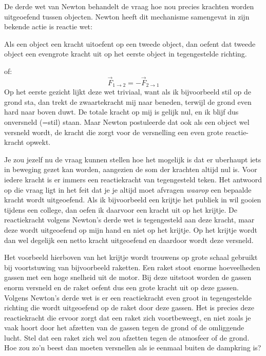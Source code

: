 De derde wet van Newton behandelt de vraag hoe nou precies krachten worden uitgeoefend
tussen objecten. Newton heeft dit mechanisme samengevat in zijn bekende actie is reactie wet:
\begin{Newton3}
Als een object een kracht uitoefent op een tweede object, dan oefent dat tweede object een
evengrote kracht uit op het eerste object in tegengestelde richting.
\end{Newton3}
of:
\begin{equation}
\vec{F}_{1\rightarrow2} = - \vec{F}_{2\rightarrow1}
\end{equation}
Op het eerste gezicht lijkt deze wet triviaal, want als ik bijvoorbeeld stil op de grond sta, dan
trekt de zwaartekracht mij naar beneden, terwijl de grond even hard naar boven duwt. De 
totale kracht op mij is gelijk nul, en ik blijf dus onversneld (=stil) staan. Maar Newton postuleerde
dat ook als een object wel versneld wordt, de kracht die zorgt voor de versnelling een even
grote reactie-kracht opwekt.

Je zou jezelf nu de vraag kunnen stellen hoe het mogelijk is dat er uberhaupt iets in 
beweging gezet kan worden, aangezien de som der krachten altijd nul is. Voor iedere
kracht is er immers een reactiekracht van tegengesteld teken. Het antwoord op die vraag
ligt in het feit dat je je altijd moet afvragen {\it waarop} een bepaalde kracht wordt uitgeoefend.
Als ik bijvoorbeeld een krijtje het publiek in wil gooien tijdens een college, dan oefen ik
daarvoor een kracht uit op het krijtje. De reactiekracht volgens Newton's derde wet is tegengesteld
aan deze kracht, maar deze wordt uitgeoefend op mijn hand en niet op het krijtje. Op
het krijtje wordt dan wel degelijk een netto kracht uitgeoefend en daardoor wordt deze 
versneld.

Het voorbeeld hierboven van het krijtje wordt trouwens op grote schaal gebruikt bij
voortstuwing van bijvoorbeeld raketten. Een raket stoot
enorme hoeveelheden gassen met een hoge snelheid uit de motor. Bij deze
uitstoot worden de gassen enorm versneld en de raket oefent dus een grote kracht
uit op deze gassen. Volgens Newton's derde wet is er een reactiekracht even groot in 
tegengestelde richting die wordt uitgeoefend op de raket door deze gassen. Het is precies
deze reactiekracht die ervoor zorgt dat een raket zich voortbeweegt, en niet zoals je
vaak hoort door het afzetten van de gassen tegen de grond of de omliggende lucht. Stel dat een
raket zich wel zou afzetten tegen de atmosfeer of de grond. Hoe zou zo'n beest dan moeten
versnellen als ie eenmaal buiten de dampkring is?

